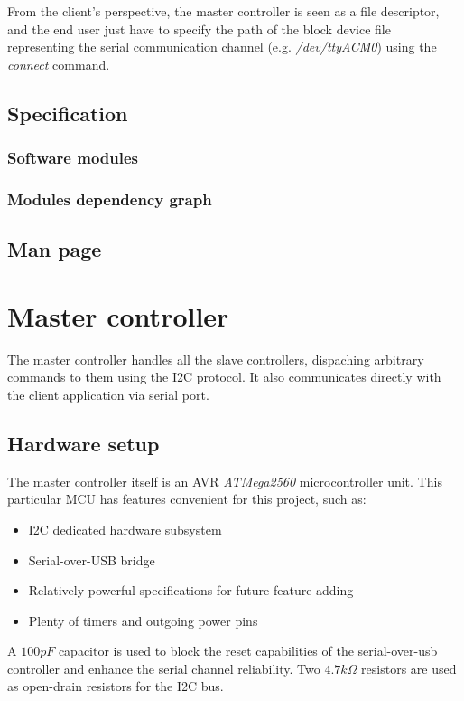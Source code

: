 \documentclass[binding=0.6cm,Lau]{sapthesis}
\begin{document}
From the client's perspective, the master controller is seen as a file
descriptor, and the end user just have to specify the path of the block device
file representing the serial communication channel (e.g. \emph{/dev/ttyACM0})
using the \emph{connect} command.

\section{Specification}
\subsection{Software modules}
\subsection{Modules dependency graph}

\section{Man page}
\label{sec:client-manpage}


\chapter{Master controller}
\label{ch:master}
The master controller handles all the slave controllers, dispaching arbitrary
commands to them using the I2C protocol. It also communicates directly with the
client application via serial port.

\section{Hardware setup}
The master controller itself is an AVR \emph{ATMega2560} microcontroller unit\cite{at2560-ref}.
This particular MCU has features convenient for this project, such as:
\begin{itemize}
  \item I2C dedicated hardware subsystem
  \item Serial-over-USB bridge
  \item Relatively powerful specifications for future feature adding
  \item Plenty of timers and outgoing power pins
\end{itemize}

A $100 pF$ capacitor is used to block the reset capabilities of the
serial-over-usb controller and enhance the serial channel reliability. Two
$4.7 k\Omega$ resistors are used as open-drain resistors for the I2C bus.
\end{document}
